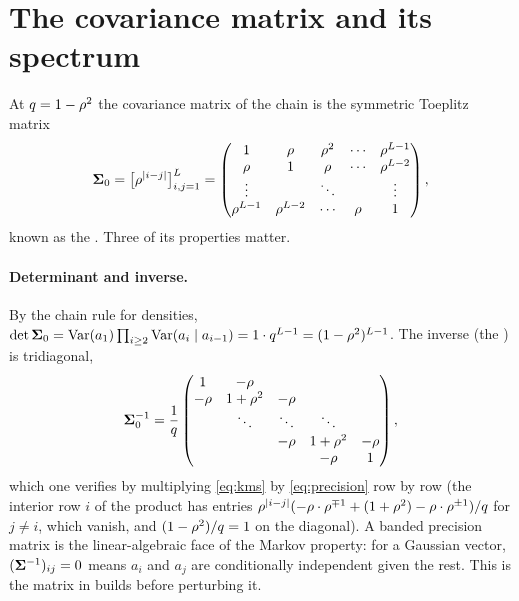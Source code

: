 \section{The covariance matrix and its spectrum}
\label{sec:spectrum}

At $q=1-\rho^2$ the covariance matrix of the chain is the symmetric Toeplitz matrix
\begin{equation}
  \mathbf{\Sigma}_0=\bigl[\rho^{|i-j|}\bigr]_{i,j=1}^{L}
  =\begin{pmatrix}1&\rho&\rho^2&\cdots&\rho^{L-1}\\ \rho&1&\rho&\cdots&\rho^{L-2}\\
  \vdots&&\ddots&&\vdots\\ \rho^{L-1}&\rho^{L-2}&\cdots&\rho&1\end{pmatrix},
  \label{eq:kms}
\end{equation}
known as the . Three of its properties matter.

\paragraph{Determinant and inverse.}
By the chain rule for densities, $\det\mathbf{\Sigma}_0=\operatorname{Var}(a_1)\prod_{i\ge2}\operatorname{Var}(a_i\mid a_{i-1})=1\cdot q^{L-1}=(1-\rho^2)^{L-1}$.
The inverse (the ) is tridiagonal,
\begin{equation}
  \mathbf{\Sigma}_0^{-1}=\frac1{q}\begin{pmatrix}1&-\rho&&&\\ -\rho&1+\rho^2&-\rho&&\\ &\ddots&\ddots&\ddots&\\
  &&-\rho&1+\rho^2&-\rho\\ &&&-\rho&1\end{pmatrix},
  \label{eq:precision}
\end{equation}
which one verifies by multiplying \cref{eq:kms} by \cref{eq:precision} row by row
(the interior row $i$ of the product has entries $\rho^{|i-j|}(-\rho\cdot\rho^{\mp1}+(1+\rho^2)-\rho\cdot\rho^{\pm1})/q$
for $j\ne i$, which vanish, and $(1-\rho^2)/q=1$ on the diagonal). A banded
precision matrix is the linear-algebraic face of the Markov property: for a Gaussian
vector, $(\mathbf{\Sigma}^{-1})_{ij}=0$ means $a_i$ and $a_j$ are conditionally independent given
the rest. This is the matrix  in
 builds before perturbing it.

